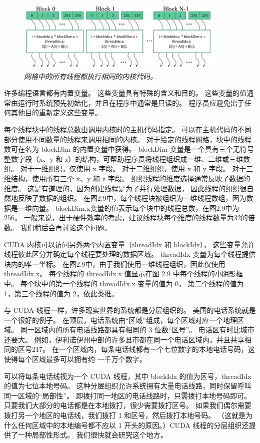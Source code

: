 \begin{figure}[H]
	\centering
	\includegraphics[width=0.9\textwidth]{figs/F2.9.png}
	\caption{\textit{网格中的所有线程都执行相同的内核代码。}}
\end{figure}

\begin{remark}[内置变量]
	许多编程语言都有内置变量。 这些变量具有特殊的含义和目的。 
	这些变量的值通常由运行时系统预先初始化，并且在程序中通常是只读的。 程序员应避免出于任何其他目的重新定义这些变量。
\end{remark}

每个线程块中的线程总数由调用内核时的主机代码指定。 可以在主机代码的不同部分使用不同数量的线程来调用相同的内核。 
对于给定的线程网格，块中的线程数可在名为 blockDim 的内置变量中获得。 
blockDim 变量是一个具有三个无符号整数字段（x、y 和 z）的结构，可帮助程序员将线程组织成一维、二维或三维数组。 
对于一维组织，仅使用 x 字段。 对于二维组织，使用 x 和 y 字段。 对于三维结构，使用所有三个 x、y 和 z 字段。 
组织线程的维度选择通常反映了数据的维度。 这是有道理的，因为创建线程是为了并行处理数据，
因此线程的组织很自然地反映了数据的组织。 在图2.9中，每个线程块被组织为一维线程数组，因为数据是一维向量。 
blockDim.x变量的值表示每个块中的线程总数，在图2.9中为256。 
一般来说，出于硬件效率的考虑，建议线程块每个维度的线程数量为32的倍数。 我们稍后会再讨论这个问题。

CUDA 内核可以访问另外两个内置变量（threadIdx 和 blockIdx），
这些变量允许线程彼此区分并确定每个线程要处理的数据区域。 threadIdx 变量为每个线程提供块内的唯一坐标。 
在图2.9中，由于我们使用一维线程组织，因此仅使用threadIdx.x。 
每个线程的 threadIdx.x 值显示在图 2.9 中每个线程的小阴影框中。 每个块中的第一个线程的 threadIdx.x 变量的值为 0，
第二个线程的值为 1，第三个线程的值为 2，依此类推。

\begin{remark}[层级组织]
与 CUDA 线程一样，许多现实世界的系统都是分层组织的。 美国的电话系统就是一个很好的例子。 
在顶层，电话系统由“区域”组成，每个区域对应一个地理区域。 同一区域内的所有电话线路都具有相同的 3 位数“区号”。 
电话区有时比城市还要大。 例如，伊利诺伊州中部的许多县市都在同一个电话区域内，并且共享相同的区号217。
在一个区域内，每条电话线都有一个七位数字的本地电话号码，这使得每个区域最多可以拥有约 一千万个数字。

可以将每条电话线视为一个 CUDA 线程，其中 blockIdx 的值为区号，threadIdx 的值为七位本地号码。 
这种分层组织允许系统拥有大量电话线路，同时保留呼叫同一区域的“局部性”。 
即拨打同一地区的电话线路时，只需拨打本地号码即可。 只要我们大部分的电话都是在本地拨打，很少需要拨打区号。 
如果我们偶尔需要拨打另一个地区的电话线，我们拨打 1 和区号，然后拨打本地号码。 
（这就是为什么任何区域中的本地编号都不应以 1 开头的原因。）CUDA 线程的分层组织还提供了一种局部性形式。 
我们很快就会研究这个地方。
\end{remark}

